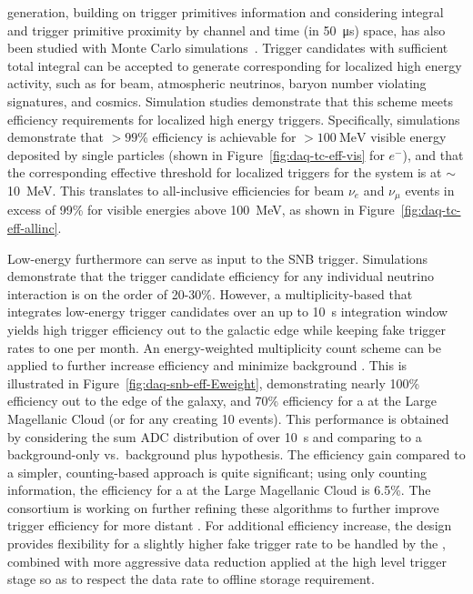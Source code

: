  generation, building on trigger primitives information
and considering integral  and trigger primitive proximity by channel
and time (in \SI{50}{\micro\second}) space, has also been studied with Monte
Carlo simulations~\cite{bib:docdb11215}.
Trigger candidates with sufficient total integral   can be accepted to
generate corresponding  for localized high energy
activity, such as for beam, atmospheric neutrinos, baryon number
violating signatures, and cosmics.
Simulation studies demonstrate that this scheme meets efficiency
requirements for localized high energy triggers.
Specifically, simulations demonstrate that $>99$\% efficiency is
achievable for $>\SI{100}{\MeV}$ visible energy deposited by single particles
(shown in Figure~\ref{fig:daq-tc-eff-vis} for $e^-$), and that the
corresponding effective threshold for localized triggers for the system
is at $\sim$\SI{10}{\MeV}. This translates to all-inclusive efficiencies for
beam $\nu_e$ and $\nu_\mu$ events in excess of 99\% for visible energies
above \SI{100}{\MeV}, as shown in Figure~\ref{fig:daq-tc-eff-allinc}.

Low-energy  furthermore can serve as input to the
SNB trigger. Simulations demonstrate that the trigger candidate
efficiency for any individual  neutrino interaction is on the order
of 20-30\%. However, a multiplicity-based 
 that integrates low-energy trigger candidates over an up to \SI{10}{\second}
integration window yields high trigger efficiency out to the
galactic edge while keeping fake  trigger rates to one per
month. An energy-weighted multiplicity count scheme can be
applied to further increase efficiency and minimize background
\cite{bib:docdb14522}. This is illustrated in
Figure~\ref{fig:daq-snb-eff-Eweight}, demonstrating nearly 100\% efficiency
out to the edge of the galaxy, and 70\% efficiency for a  at
the Large Magellanic Cloud (or for any  creating 10
events). This performance is obtained by considering the sum ADC
distribution of  over \SI{10}{\second} and comparing to a background-only
vs.~background plus  hypothesis. The efficiency gain compared to a
simpler,  counting-based approach is quite significant; using
only counting information, the efficiency for a  at
the Large Magellanic Cloud is 6.5\%. The 
consortium is working on further refining these algorithms to further improve
 trigger efficiency for more distant . For
additional efficiency increase, the design provides flexibility
for a slightly higher fake  trigger rate to be handled by
the , combined with more aggressive data reduction
applied at the high level trigger stage so as to respect the data rate to
offline storage requirement.

